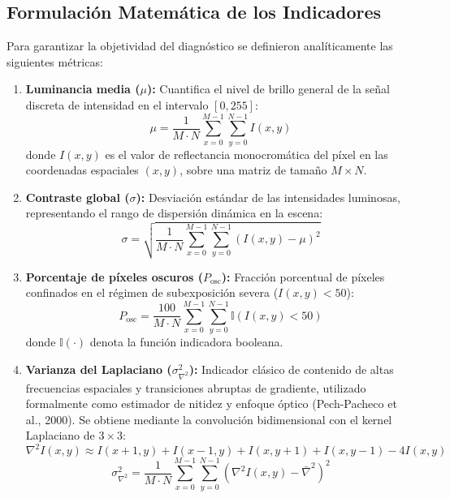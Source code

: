 \documentclass[12pt,letterpaper]{article}
\begin{document}
\subsection{Formulaci\'on Matem\'atica de los Indicadores}
Para garantizar la objetividad del diagn\'ostico se definieron anal\'iticamente las siguientes m\'etricas:
\begin{enumerate}
    \item \textbf{Luminancia media ($\mu$):} Cuantifica el nivel de brillo general de la se\~nal discreta de intensidad en el intervalo $[0, 255]$:
    \begin{equation}
        \mu = \frac{1}{M \cdot N} \sum_{x=0}^{M-1} \sum_{y=0}^{N-1} I(x,y)
    \end{equation}
    donde $I(x,y)$ es el valor de reflectancia monocrom\'atica del p\'ixel en las coordenadas espaciales $(x,y)$, sobre una matriz de tama\~no $M \times N$.
    \item \textbf{Contraste global ($\sigma$):} Desviaci\'on est\'andar de las intensidades luminosas, representando el rango de dispersi\'on din\'amica en la escena:
    \begin{equation}
        \sigma = \sqrt{\frac{1}{M \cdot N} \sum_{x=0}^{M-1} \sum_{y=0}^{N-1} \left( I(x,y) - \mu \right)^2}
    \end{equation}
    \item \textbf{Porcentaje de p\'ixeles oscuros ($P_{\text{osc}}$):} Fracci\'on porcentual de p\'ixeles confinados en el r\'egimen de subexposici\'on severa ($I(x,y) < 50$):
    \begin{equation}
        P_{\text{osc}} = \frac{100}{M \cdot N} \sum_{x=0}^{M-1} \sum_{y=0}^{N-1} \mathbb{I}\left(I(x,y) < 50\right)
    \end{equation}
    donde $\mathbb{I}(\cdot)$ denota la funci\'on indicadora booleana.
    \item \textbf{Varianza del Laplaciano ($\sigma^2_{\nabla^2}$):} Indicador cl\'asico de contenido de altas frecuencias espaciales y transiciones abruptas de gradiente, utilizado formalmente como estimador de nitidez y enfoque \'optico (Pech-Pacheco et al., 2000). Se obtiene mediante la convoluci\'on bidimensional con el kernel Laplaciano de $3 \times 3$:
    \begin{equation}
        \nabla^2 I(x,y) \approx I(x+1,y) + I(x-1,y) + I(x,y+1) + I(x,y-1) - 4I(x,y)
    \end{equation}
    \begin{equation}
        \sigma^2_{\nabla^2} = \frac{1}{M \cdot N} \sum_{x=0}^{M-1} \sum_{y=0}^{N-1} \left( \nabla^2 I(x,y) - \bar{\nabla}^2 \right)^2

\end{equation}
\end{enumerate}
\end{document}
